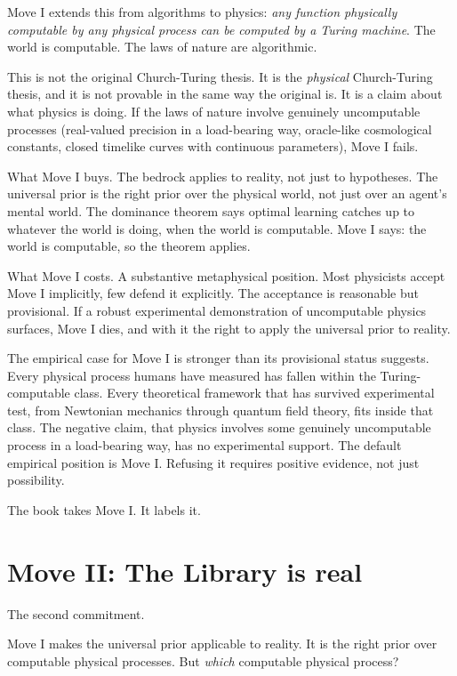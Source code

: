 Move I extends this from algorithms to physics: \emph{any function physically computable by any physical process can be computed by a Turing machine}. The world is computable. The laws of nature are algorithmic.

This is not the original Church-Turing thesis. It is the \emph{physical} Church-Turing thesis, and it is not provable in the same way the original is. It is a claim about what physics is doing. If the laws of nature involve genuinely uncomputable processes (real-valued precision in a load-bearing way, oracle-like cosmological constants, closed timelike curves with continuous parameters), Move I fails.

What Move I buys. The bedrock applies to reality, not just to hypotheses. The universal prior is the right prior over the physical world, not just over an agent's mental world. The dominance theorem says optimal learning catches up to whatever the world is doing, when the world is computable. Move I says: the world is computable, so the theorem applies.

What Move I costs. A substantive metaphysical position. Most physicists accept Move I implicitly, few defend it explicitly. The acceptance is reasonable but provisional. If a robust experimental demonstration of uncomputable physics surfaces, Move I dies, and with it the right to apply the universal prior to reality.

The empirical case for Move I is stronger than its provisional status suggests. Every physical process humans have measured has fallen within the Turing-computable class. Every theoretical framework that has survived experimental test, from Newtonian mechanics through quantum field theory, fits inside that class. The negative claim, that physics involves some genuinely uncomputable process in a load-bearing way, has no experimental support. The default empirical position is Move I. Refusing it requires positive evidence, not just possibility.

The book takes Move I. It labels it.

\section*{Move II: The Library is real}

The second commitment.

Move I makes the universal prior applicable to reality. It is the right prior over computable physical processes. But \emph{which} computable physical process?

